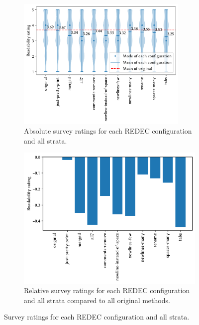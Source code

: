 \documentclass[%
class=scrreprt,
chapterprefix=false,%
open=right,%
twoside=false,%
paper=a4,%
logofile={Logo\_zentral\_farbig\_EN.png},%
thesistype=master,%
UKenglish,%
]{se2thesis}
\theoremstyle{definition}
\newcommand{\rdh}{REDEC\xspace}
\begin{document}
	\begin{figure}[p]
		\centering
		\begin{subfigure}{\linewidth}
			\includegraphics[width=0.9\textwidth]{img/survey_ratings_violin_all_m.pdf}
			\caption{Absolute survey ratings for each \rdh configuration and all strata.}
			\label{fig:survey_ratings_violin_all}
		\end{subfigure}
		\hfill
		\begin{subfigure}{\textwidth}
			\includegraphics[width=0.9\linewidth]{img/survey_ratings_bar_all_m.pdf}
			\caption{Relative survey ratings for each \rdh configuration and all strata compared to all original methods.}
			\label{fig:survey_ratings_bar_all}
		\end{subfigure}
		\caption{Survey ratings for each \rdh configuration and all strata.}
		\label{fig:survey_time_all}
	\end{figure}
	
\end{document}

